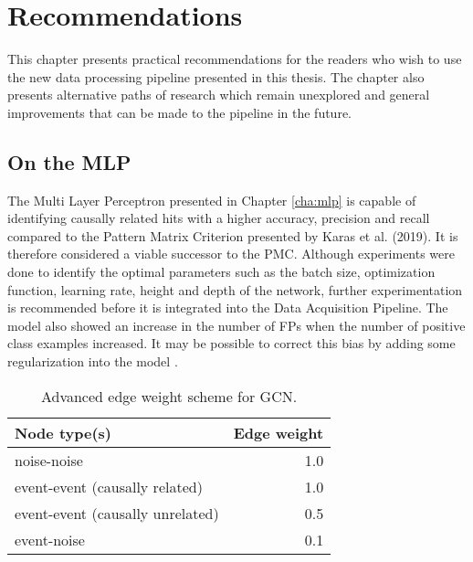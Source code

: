 
\chapter{Recommendations} %
\label{cha:rec}

%

This chapter presents practical recommendations for the readers who
wish to use the new data processing pipeline presented in this thesis.
The chapter also presents alternative paths of research which remain
unexplored and general improvements that can be made to the pipeline
in the future.

\section{On the MLP}
The Multi Layer Perceptron presented in Chapter \ref{cha:mlp} is
capable of identifying causally related hits with a higher accuracy,
precision and recall compared to the Pattern Matrix Criterion
presented by Karas et al. (2019). It is therefore considered a viable
successor to the PMC. Although experiments were done to identify the
optimal parameters such as the batch size, optimization function,
learning rate, height and depth of the network, further
experimentation is recommended before it is integrated into the Data
Acquisition Pipeline. The model also showed an increase in the number
of FPs when the number of positive class examples increased. It may be
possible to correct this bias by adding some regularization into the
model \cite{goodfellow2016deep}.

\begin{table}[htb]
  \centering
  \caption{Advanced edge weight scheme for GCN.}
  \begin{tabular}{lr}
    \hline
    Node type(s) & Edge weight \\
    \hline
    noise-noise & 1.0 \\
    event-event (causally related) & 1.0 \\
    event-event (causally unrelated) & 0.5 \\
    event-noise & 0.1 \\
    \hline
  \end{tabular}
  \label{tab:gcn-adv-weights}
\end{table}

